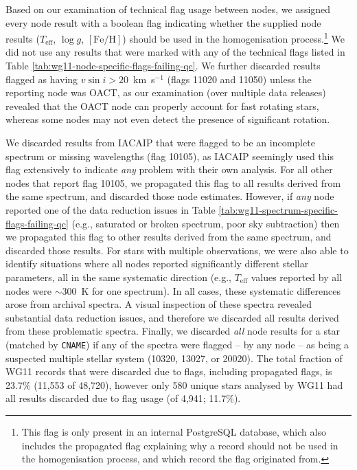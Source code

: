 \documentclass[preprint]{aastex}
\newcommand{\teff}{T_{\mathrm{eff}}}
\newcommand{\logg}{\log g}
\newcommand{\feh}{[\mathrm{Fe/H}]}
\begin{document}
Based on our examination of technical flag usage between nodes, we assigned every node 
result with a boolean flag indicating whether the supplied node results ($\teff$, $\logg$,
$\feh$) should be used in the homogenisation process.\footnote{This flag is only present
in an internal PostgreSQL database, which also includes the propagated flag explaining
why a record should not be used in the homogenisation process, and which record the flag
originated from.}  We did not use any results that were marked with any of the technical
flags listed in Table \ref{tab:wg11-node-specific-flags-failing-qc}.  We further discarded 
results flagged as having $v\sin{i} > 20$~km~s$^{-1}$ (flags 11020 and 11050) unless the 
reporting node was OACT, as our examination (over multiple data releases) revealed that 
the OACT node can properly account for fast rotating stars, whereas some nodes may not 
even detect the presence of significant rotation. 


We discarded results from IACAIP that were flagged to be an incomplete spectrum or 
missing wavelengths (flag 10105), as IACAIP seemingly used this flag extensively to 
indicate \emph{any} problem with their own analysis.  For all other nodes that report
flag 10105, we propagated this flag to all results derived from the same spectrum,
and discarded those node estimates.  However, if \emph{any} node reported one of the
data reduction issues in Table \ref{tab:wg11-spectrum-specific-flags-failing-qc}
(e.g., saturated or broken spectrum, poor sky subtraction) then we propagated this 
flag to other results derived from the same spectrum, and discarded those results.
For stars with multiple observations, we were also able to identify situations where 
all nodes reported significantly different stellar parameters, all in the same 
systematic direction (e.g., $\teff$ values reported by all nodes were $\sim$300~K for 
one spectrum). In all cases, these systematic differences arose from archival spectra. 
A visual inspection of these spectra revealed substantial data reduction issues, and 
therefore we discarded all results derived from these problematic spectra.  Finally, 
we discarded \emph{all} node results for a star (matched by \texttt{CNAME}) if any of 
the spectra were flagged -- by any node -- as being a suspected multiple stellar system 
(10320, 13027, or 20020). The total fraction of WG11 records that were discarded due to
flags, including propagated flags, is 23.7\% (11,553 of 48,720), however only 580 unique 
stars analysed by WG11 had all results discarded due to flag usage (of 4,941; 11.7\%).
\end{document}
